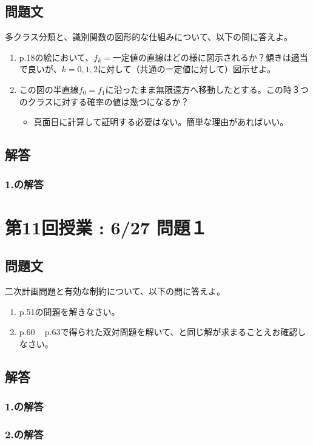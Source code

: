 \documentclass{article}[jsarticle]
\begin{document}
    \subsection{問題文}
    多クラス分類と、識別関数の図形的な仕組みについて、以下の問に答えよ。
    \begin{enumerate}
        \item p.18の絵において、$f_k = \text{一定値}$の直線はどの様に図示されるか？傾きは適当で良いが、$k = 0,1,2$に対して（共通の一定値に対して）図示せよ。
        \item この図の半直線$f_0 = f_1$に沿ったまま無限遠方へ移動したとする。この時３つのクラスに対する確率の値は幾つになるか？
        \begin{itemize}
            \item 真面目に計算して証明する必要はない。簡単な理由があればいい。
        \end{itemize}
    \end{enumerate}
    \subsection{解答}
    \subsubsection{1.の解答}


\section{第11回授業 : 6/27 問題１}

    \subsection{問題文}
    二次計画問題と有効な制約について、以下の問に答えよ。
    \begin{enumerate}
        \item p.51の問題を解きなさい。
        \item p.60 ~ p.63で得られた双対問題を解いて、と同じ解が求まることえお確認しなさい。
    \end{enumerate}
    \subsection{解答}
    \subsubsection{1.の解答}
    


    \subsubsection{2.の解答}

    
\end{document}
